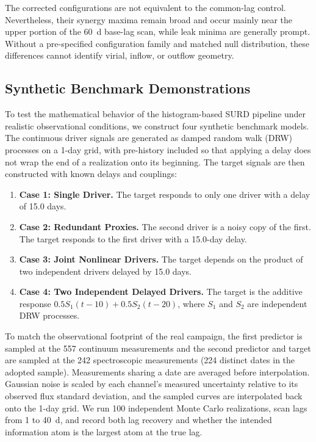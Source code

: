 \documentclass[fleqn,usenatbib]{mnras}
\begin{document}
The corrected configurations are not equivalent to the common-lag control. Nevertheless, their synergy maxima remain broad and occur mainly near the upper portion of the 60~d base-lag scan, while leak minima are generally prompt. Without a pre-specified configuration family and matched null distribution, these differences cannot identify virial, inflow, or outflow geometry.

\subsection{Synthetic Benchmark Demonstrations}
\label{sec:synthetic_benchmarks}
To test the mathematical behavior of the histogram-based SURD pipeline under realistic observational conditions, we construct four synthetic benchmark models. The continuous driver signals are generated as damped random walk (DRW) processes on a 1-day grid, with pre-history included so that applying a delay does not wrap the end of a realization onto its beginning. The target signals are then constructed with known delays and couplings:
\begin{enumerate}
\item \textbf{Case 1: Single Driver.} The target responds to only one driver with a delay of 15.0 days.
\item \textbf{Case 2: Redundant Proxies.} The second driver is a noisy copy of the first. The target responds to the first driver with a 15.0-day delay.
\item \textbf{Case 3: Joint Nonlinear Drivers.} The target depends on the product of two independent drivers delayed by 15.0 days.
\item \textbf{Case 4: Two Independent Delayed Drivers.} The target is the additive response $0.5 S_1(t-10) + 0.5 S_2(t-20)$, where $S_1$ and $S_2$ are independent DRW processes.
\end{enumerate}

To match the observational footprint of the real campaign, the first predictor is sampled at the 557 continuum measurements and the second predictor and target are sampled at the 242 spectroscopic measurements (224 distinct dates in the adopted sample). Measurements sharing a date are averaged before interpolation. Gaussian noise is scaled by each channel's measured uncertainty relative to its observed flux standard deviation, and the sampled curves are interpolated back onto the 1-day grid. We run 100 independent Monte Carlo realizations, scan lags from 1 to 40~d, and record both lag recovery and whether the intended information atom is the largest atom at the true lag.
\end{document}
